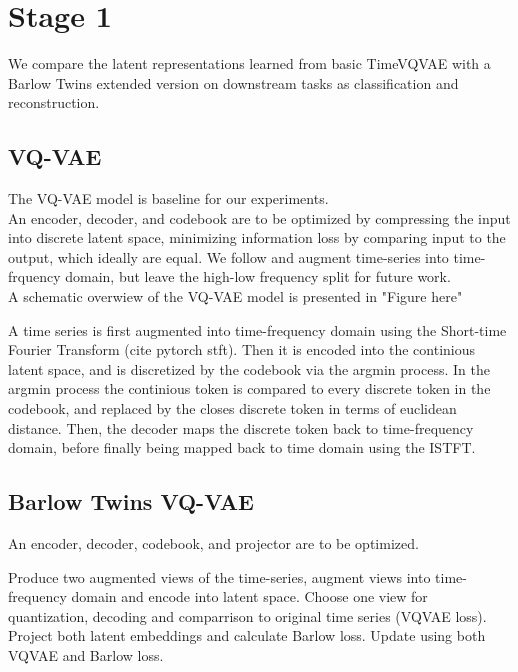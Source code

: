 \documentclass[../../thesis.tex]{subfiles}
\begin{document}

\section{Stage 1}
We compare the latent representations learned from basic TimeVQVAE with a Barlow Twins extended version on downstream tasks as classification and reconstruction.

\subsection{VQ-VAE}
The VQ-VAE model is baseline for our experiments.\\

An encoder, decoder, and codebook are to be optimized by compressing the input into discrete latent space, minimizing information loss by comparing input to the output, which ideally are equal. We follow \cite{TimeVQVAE} and augment time-series into time-frquency domain, but leave the high-low frequency split for future work. \\

A schematic overwiew of the VQ-VAE model is presented in "Figure here"

A time series is first augmented into time-frequency domain using the Short-time Fourier Transform (cite pytorch stft). Then it is encoded into the continious latent space, and is discretized by the codebook via the argmin process. In the argmin process the continious token is compared to every discrete token in the codebook, and replaced by the closes discrete token in terms of euclidean distance. Then, the decoder maps the discrete token back to time-frequency domain, before finally being mapped back to time domain using the ISTFT.



\subsection{Barlow Twins VQ-VAE}

An encoder, decoder, codebook, and projector are to be optimized.

Produce two augmented views of the time-series, augment views into time-frequency domain and encode into latent space. Choose one view for quantization, decoding and comparrison to original time series (VQVAE loss). Project both latent embeddings and calculate Barlow loss. Update using both VQVAE and Barlow loss.
\end{document}
